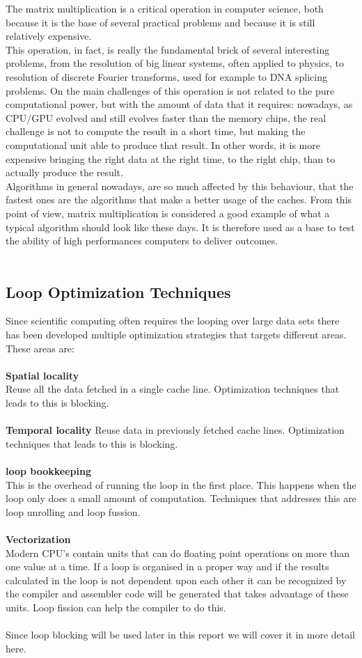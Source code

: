 The matrix multiplication is a critical operation in computer science, both because it is the base of several practical problems and because it is still relatively expensive. \\
This operation, in fact, is really the fundamental brick of several interesting problems, from the resolution of big linear systems, often applied to physics, to resolution of discrete Fourier transforms, used for example to DNA splicing problems.
On the main challenges of this operation is not related to the pure computational power, but with the amount of data that it requires: nowadays, as CPU/GPU evolved and still evolves faster than the memory chips, the real challenge is not to compute the result in a short time, but making the computational unit able to produce that result. In other words, it is more expensive bringing the right data at the right time, to the right chip, than to actually produce the result. \\
Algorithms in general nowadays, are so much affected by this behaviour, that the fastest ones are the algorithms that make a better usage of the caches.
From this point of view, matrix multiplication is considered a good example of what a typical algorithm should look like these days. It is therefore used as a base to test the ability of high performances computers to deliver outcomes. 
\\\\
\subsection{Loop Optimization Techniques}
Since scientific computing often requires the looping over large data sets there has been developed multiple optimization strategies that targets different areas. These areas are:
\\\\
\textbf{Spatial locality}\\
Reuse all the data fetched in a single cache line. Optimization techniques that leads to this is blocking.
\\\\
\textbf{Temporal locality}
Reuse data in previously fetched cache lines. Optimization techniques that leads to this is blocking.
\\\\
\textbf{loop bookkeeping}\\ 
This is the overhead of running the loop in the first place. This happens when the loop only does a small amount of computation. Techniques that addresses this are loop unrolling and loop fussion. 
\\\\
\textbf{Vectorization}\\
Modern CPU's contain units that can do floating point operations on more than one value at a time. If a loop is organised in a proper way and if the results calculated in the loop is not dependent upon each other it can be recognized by the compiler and assembler code will be generated that takes advantage of these units. Loop fission can help the compiler to do this. 
\\\\
Since loop blocking will be used later in this report we will cover it in more detail here.
